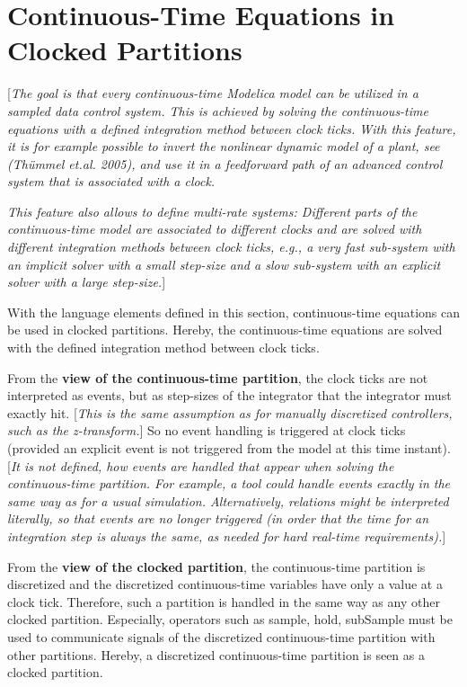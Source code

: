 \documentclass[10pt,a4paper]{report}
\def\doublelabel#1{\label{#1}}
\begin{document}
\section{Continuous-Time Equations in Clocked Partitions}\doublelabel{continuous-time-equations-in-clocked-partitions}

{[}\emph{The goal is that every continuous-time Modelica model can be
utilized in a sampled data control system. This is achieved by solving
the continuous-time equations with a defined integration method between
clock ticks. With this feature, it is for example possible to invert the
nonlinear dynamic model of a plant, see (Thümmel et.al. 2005), and use
it in a feedforward path of an advanced control system that is
associated with a clock.}

\emph{This feature also allows to define multi-rate systems: Different
parts of the continuous-time model are associated to different clocks
and are solved with different integration methods between clock ticks,
e.g., a very fast sub-system with an implicit solver with a small
step-size and a slow sub-system with an explicit solver with a large
step-size.}{]}

With the language elements defined in this section, continuous-time
equations can be used in clocked partitions. Hereby, the continuous-time
equations are solved with the defined integration method between clock
ticks.

From the \textbf{view of the continuous-time partition}, the clock ticks
are not interpreted as events, but as step-sizes of the integrator that
the integrator must exactly hit. {[}\emph{This is the same assumption as
for manually discretized controllers, such as the z-transform.}{]} So no
event handling is triggered at clock ticks (provided an explicit event
is not triggered from the model at this time instant). {[}\emph{It is
not defined, how events are handled that appear when solving the
continuous-time partition. For example, a tool could handle events
exactly in the same way as for a usual simulation. Alternatively,
relations might be interpreted literally, so that events are no longer
triggered (in order that the time for an integration step is always the
same, as needed for hard real-time requirements).}{]}

From the \textbf{view of the clocked partition}, the continuous-time
partition is discretized and the discretized continuous-time variables
have only a value at a clock tick. Therefore, such a partition is
handled in the same way as any other clocked partition. Especially,
operators such as sample, hold, subSample must be used to communicate
signals of the discretized continuous-time partition with other
partitions. Hereby, a discretized continuous-time partition is seen as a
clocked partition.
\end{document}
